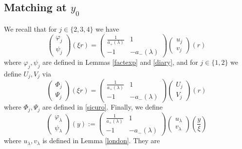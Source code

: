\documentclass[11 pt]{amsart}
\theoremstyle{definition}
\theoremstyle{remark}
\numberwithin{equation}{section}
\begin{document}
\subsection{Matching at $y_0$}

We recall that for $j \in \{ 2, 3, 4 \}$ we have
\[ \left(\begin{array}{c}
     \varphi_j\\
     \psi_j
   \end{array}\right) (\xi r) = \left(\begin{array}{cc}
     \frac{1}{a_+ (\lambda)} & 1\\
     - 1 & - a_- (\lambda)
   \end{array}\right) \left(\begin{array}{c}
     u_j\\
     v_j
   \end{array}\right) (r) \]
where $\varphi_j, \psi_j$ are defined in Lemmas \ref{factexp} and \ref{diary},
and for $j \in \{ 1, 2 \}$ we define $U_j, V_j$ via
\[ \left(\begin{array}{c}
     \Phi_j\\
     \Psi_j
   \end{array}\right) (\xi r) = \left(\begin{array}{cc}
     \frac{1}{a_+ (\lambda)} & 1\\
     - 1 & - a_- (\lambda)
   \end{array}\right) \left(\begin{array}{c}
     U_j\\
     V_j
   \end{array}\right) (r) \]
where $\Phi_j, \Psi_j$ are defined in \ref{sicuro}. Finally, we define
\begin{equation}
    \label{cands} \left(\begin{array}{c}
     \varphi_{\lambda}\\
     \psi_{\lambda}
   \end{array}\right) (y) := \left(\begin{array}{cc}
     \frac{1}{a_+ (\lambda)} & 1\\
     - 1 & - a_- (\lambda)
   \end{array}\right) \left(\begin{array}{c}
     u_{\lambda}\\
     v_{\lambda}
   \end{array}\right) \left( \frac{y}{\xi} \right)
\end{equation}
where $u_{\lambda}, v_{\lambda}$ is defined in Lemma \ref{london}. They are
\end{document}
